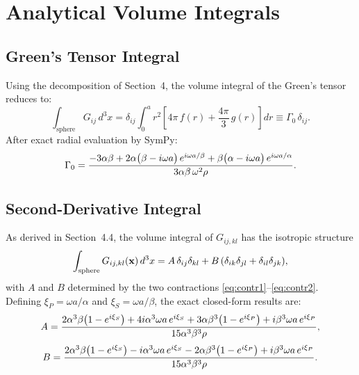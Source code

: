 \section{Analytical Volume Integrals}

\subsection{Green's Tensor Integral}

Using the decomposition of Section~4, the volume integral of the Green's
tensor reduces to:
\begin{equation}
  \int_{\text{sphere}} G_{ij}\,d^3x
  = \delta_{ij} \int_0^a r^2
    \left[4\pi\,f(r) + \frac{4\pi}{3}\,g(r)\right] dr
  \equiv \Gamma_0\,\delta_{ij}.
\label{eq:Gamma0}
\end{equation}
After exact radial evaluation by SymPy:
\begin{equation}
  \Gamma_0 = \frac{%
    -3\alpha\beta
    + 2\alpha\bigl(\beta - i\omega a\bigr)\,e^{i\omega a/\beta}
    + \beta\bigl(\alpha - i\omega a\bigr)\,e^{i\omega a/\alpha}
  }{3\alpha\beta\,\omega^2\rho}.
\label{eq:Gamma0result}
\end{equation}

\subsection{Second-Derivative Integral}

As derived in Section~4.4, the volume integral of $G_{ij,kl}$ has the
isotropic structure
\begin{equation}
  \int_{\text{sphere}} G_{ij,kl}(\mathbf{x})\,d^3x
  = A\,\delta_{ij}\delta_{kl}
  + B\,(\delta_{ik}\delta_{jl} + \delta_{il}\delta_{jk}),
\label{eq:ABiso}
\end{equation}
with $A$ and $B$ determined by the two contractions
\eqref{eq:contr1}--\eqref{eq:contr2}.  Defining
$\xi_P = \omega a/\alpha$ and $\xi_S = \omega a/\beta$, the exact
closed-form results are:
\begin{equation}
  A = \frac{%
    2\alpha^3\beta\bigl(1-e^{i\xi_S}\bigr)
    + 4i\alpha^3\omega a\,e^{i\xi_S}
    + 3\alpha\beta^3\bigl(1-e^{i\xi_P}\bigr)
    + i\beta^3\omega a\,e^{i\xi_P}
  }{15\alpha^3\beta^3\rho},
\label{eq:Aresult}
\end{equation}
\begin{equation}
  B = \frac{%
    2\alpha^3\beta\bigl(1-e^{i\xi_S}\bigr)
    - i\alpha^3\omega a\,e^{i\xi_S}
    - 2\alpha\beta^3\bigl(1-e^{i\xi_P}\bigr)
    + i\beta^3\omega a\,e^{i\xi_P}
  }{15\alpha^3\beta^3\rho}.
\label{eq:Bresult}
\end{equation}

